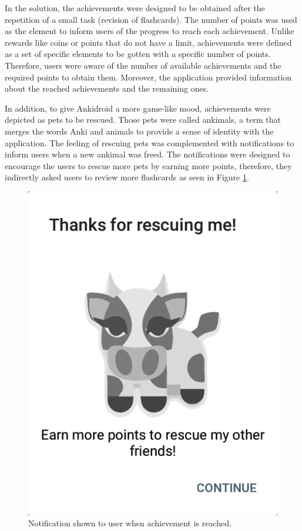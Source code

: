 In the solution, the achievements were designed to be obtained after the repetition of a small task (revision of flashcards). The number of points was used as the element to inform users of the progress to reach each achievement. Unlike rewards like coins or points that do not have a limit, achievements were defined as a set of specific elements to be gotten with a specific number of points. Therefore, users were aware of the number of available achievements and the required points to obtain them. Moreover, the application provided information about the reached achievements and the remaining ones.

In addition, to give Ankidroid a more game-like mood, achievements were depicted as pets to be rescued. Those pets were called ankimals, a term that merges the words Anki and animals to provide a sense of identity with the application. The feeling of rescuing pets was complemented with notifications to inform users when a new ankimal was freed. The notifications were designed to encourage the users to rescue more pets by earning more points, therefore, they indirectly asked users to review more flashcards as seen in Figure \ref{fig:ankimals-rescue}.

\begin{figure}[htb]
    \vskip 5mm
        \begin{center}
            \includegraphics[scale=0.35]{./Figures/achievement_notification.png}
            \caption{Notification shown to user when achievement is reached.}
            \label{fig:ankimals-rescue}
        \end{center}
    \vskip -5mm
\end{figure}

